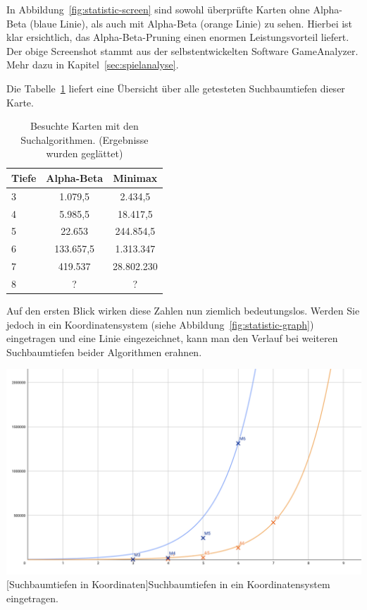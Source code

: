 In Abbildung~\ref{fig:statistic-screen} sind sowohl \"uberpr\"ufte Karten ohne Alpha-Beta (blaue Linie), als auch mit Alpha-Beta (orange Linie) zu sehen.
Hierbei ist klar ersichtlich, das Alpha-Beta-Pruning einen enormen Leistungsvorteil liefert.
Der obige Screenshot stammt aus der selbstentwickelten Software GameAnalyzer.
Mehr dazu in Kapitel~\ref{sec:spielanalyse}.

Die Tabelle~\ref{tab:search-depth} liefert eine \"Ubersicht \"uber alle getesteten Suchbaumtiefen dieser Karte.

\vspace{1em}
\begin{table}[!h]
    \centering
    \begin{tabular}{|l|c|c|}
        \hline
        \textbf{Tiefe} & \textbf{Alpha-Beta} & \textbf{Minimax}\\
        \hline
        3 & 1.079,5 & 2.434,5\\
        \hline
        4 & 5.985,5 & 18.417,5\\
        \hline
        5 & 22.653 & 244.854,5\\
        \hline
        6 & 133.657,5 & 1.313.347\\
        \hline
        7 & 419.537 & 28.802.230\\
        \hline
        8 & ? & ?\\
        \hline
    \end{tabular}
    \caption{Besuchte Karten mit den Suchalgorithmen. (Ergebnisse wurden geglättet)}
    \label{tab:search-depth}
\end{table}

Auf den ersten Blick wirken diese Zahlen nun ziemlich bedeutungslos.
Werden Sie jedoch in ein Koordinatensystem (siehe Abbildung~\ref{fig:statistic-graph}) eingetragen und eine Linie eingezeichnet, kann man den Verlauf bei weiteren Suchbaumtiefen beider Algorithmen erahnen.

\vspace{1em}
\begin{minipage}{\linewidth}
    \centering
    \includegraphics[width=0.7\linewidth]{pics/statistic-graph}
    [Suchbaumtiefen in Koordinaten]{Suchbaumtiefen in ein Koordinatensystem eingetragen.}
    \label{fig:statistic-graph}
\end{minipage}

